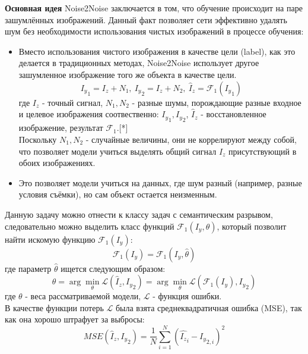 \par \textbf{Основная идея} Noise2Noise заключается в том, что обучение происходит на паре зашумлённых изображений. Данный факт позволяет сети эффективно удалять шум без необходимости использования чистых изображений в процессе обучения:
\begin{itemize}[]
	\item Вместо использования чистого изображения в качестве цели (label), как это делается в традиционных методах, Noise2Noise использует другое зашумленное изображение того же объекта в качестве цели.
	\begin{equation}
		{I_y}_1 = I_z + N_1,\
		{I_y}_2 = I_z + N_2,\
		\hat I_z = \mathscr{F}_1({I_y}_1)
	\end{equation}
	где $I_z$ - точный сигнал, $N_1, N_2$ - разные шумы, порождающие разные входное и целевое изображения соотвественно: ${I_y}_1, {I_y}_2$, $\hat I_z$ - восстановленное изображение, результат $\mathscr{F}_1$.[*]\\
	Поскольку $N_1, N_2$ - случайные величины, они не коррелируют между собой, что позволяет модели учиться выделять общий сигнал $I_z$ присутствующий в обоих изображениях.
	\item Это позволяет модели учиться на данных, где шум разный (например, разные условия съёмки), но сам объект остается неизменным.
\end{itemize}
\par Данную задачу можно отнести к классу задач с семантическим
разрывом, следовательно можно выделить класс функций $\mathscr{F}_1(I_y, \theta)$, который позволит найти искомую функцию $\mathscr{F}_1(I_y)$:
\begin{equation}
	\mathscr{F}_1(I_y) = \mathscr{F}_1(I_y, \hat \theta)
\end{equation} где параметр $\hat \theta$ ищется следующим образом:
\begin{equation}
	\hat\theta = \arg\min_{\theta}\mathscr{L}(\hat I_z, {I_y}_2) = \arg\min_{\theta}\mathscr{L}(\mathscr{F}_1(I_y), {I_y}_2)
\end{equation}
где $\theta$ - веса рассматриваемой модели, $\mathscr{L}$ - функция ошибки.\\
В качестве функции потерь $\mathscr{L}$ была взята среднеквадратичная ошибка (MSE), так как она хорошо штрафует за выбросы:\\
\begin{equation}
	MSE(\hat I_z, {I_y}_2) = \frac{1}{N}\sum_{i=1}^{N}(\hat {I_z}_i - {I_y}_{2,i})^2
\end{equation}
